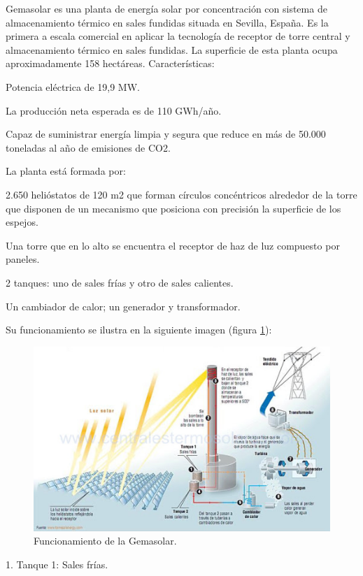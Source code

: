 Gemasolar es una planta de energía solar por concentración con sistema de almacenamiento térmico en sales fundidas situada en Sevilla, España. Es la primera a escala comercial en aplicar la tecnología de receptor de torre central y almacenamiento térmico en sales fundidas. La superficie de esta planta ocupa aproximadamente 158 hectáreas. Características:

Potencia eléctrica de 19,9 MW.

La producción neta esperada es de 110 GWh/año.

Capaz de suministrar energía limpia y segura que reduce en más de 50.000 toneladas al año de emisiones de CO2.

La planta está formada por:

2.650 helióstatos de 120 m2 que forman círculos concéntricos alrededor de la torre que disponen de un mecanismo que posiciona con precisión la superficie de los espejos.

Una torre que en lo alto se encuentra el receptor de haz de luz compuesto por paneles.

2 tanques: uno de sales frías y otro de sales calientes.

Un cambiador de calor; un generador y transformador.

Su funcionamiento se ilustra en la siguiente imagen (figura \ref{fig:FotosPaginasWebHeliostatos/unnamed(8).jpg}):

\begin{figure}[h!]
  	\centering
	\includegraphics[width=\textwidth]{FotosPaginasWebHeliostatos/unnamed(8).jpg}
	\caption{Funcionamiento de la Gemasolar.
	\label{fig:FotosPaginasWebHeliostatos/unnamed(8).jpg}}
\end{figure}

1. Tanque 1: Sales frías.


